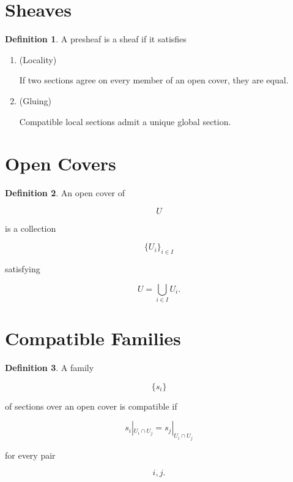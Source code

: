 \documentclass[11pt]{book}
\numberwithin{equation}{chapter}
\theoremstyle{definition}
\newtheorem{definition}{Definition}[chapter]
\theoremstyle{plain}
\begin{document}
\section{Sheaves}

\begin{definition}

A presheaf is a sheaf if it satisfies

\begin{enumerate}

\item
(Locality)

If two sections agree on every member of an open cover, they are equal.

\item
(Gluing)

Compatible local sections admit a unique global section.

\end{enumerate}

\end{definition}


\section{Open Covers}

\begin{definition}

An open cover of

\[
U
\]

is a collection

\[
\{U_i\}_{i\in I}
\]

satisfying

\[
U
=
\bigcup_{i\in I}
U_i.
\]

\end{definition}


\section{Compatible Families}

\begin{definition}

A family

\[
\{s_i\}
\]

of sections over an open cover is compatible if

\[
s_i|_{U_i\cap U_j}
=
s_j|_{U_i\cap U_j}
\]

for every pair

\[
i,j.
\]

\end{definition}
\end{document}
